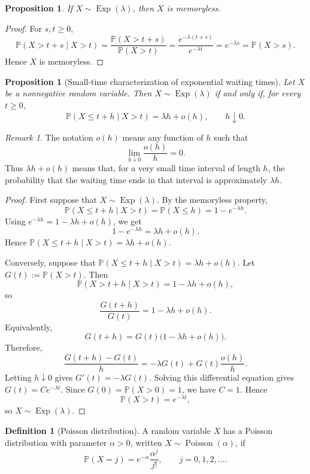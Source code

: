 \documentclass[11pt]{article}
\theoremstyle{plain}
\newtheorem{proposition}[theorem]{Proposition}
\theoremstyle{definition}
\newtheorem{definition}[theorem]{Definition}
\theoremstyle{remark}
\newtheorem{remark}[theorem]{Remark}
\begin{document}
\begin{proposition}
	If \(X\sim \operatorname{Exp}(\lambda)\), then \(X\) is memoryless.
\end{proposition}

\begin{proof}
	For \(s,t\ge 0\),
	\[
	\mathbb{P}(X>t+s\mid X>t)
	=
	\frac{\mathbb{P}(X>t+s)}{\mathbb{P}(X>t)}
	=
	\frac{e^{-\lambda(t+s)}}{e^{-\lambda t}}
	=
	e^{-\lambda s}
	=
	\mathbb{P}(X>s).
	\]
	Hence \(X\) is memoryless.
\end{proof}

\begin{proposition}[Small-time characterization of exponential waiting times]
	Let \(X\) be a nonnegative random variable. Then \(X\sim \operatorname{Exp}(\lambda)\) if and only if, for every \(t\ge 0\),
	\[
	\mathbb{P}(X\le t+h\mid X>t)=\lambda h+o(h),
	\qquad h\downarrow 0.
	\]
\end{proposition}

\begin{remark}
	The notation \(o(h)\) means any function of \(h\) such that
	\[
	\lim_{h\downarrow 0}\frac{o(h)}{h}=0.
	\]
	Thus \(\lambda h+o(h)\) means that, for a very small time interval of length \(h\), the probability that the waiting time ends in that interval is approximately \(\lambda h\).
\end{remark}

\begin{proof}
	First suppose that \(X\sim \operatorname{Exp}(\lambda)\). By the memoryless property,
	\[
	\mathbb{P}(X\le t+h\mid X>t)
	=
	\mathbb{P}(X\le h)
	=
	1-e^{-\lambda h}.
	\]
	Using \(e^{-\lambda h}=1-\lambda h+o(h)\), we get
	\[
	1-e^{-\lambda h}=\lambda h+o(h).
	\]
	Hence \(\mathbb{P}(X\le t+h\mid X>t)=\lambda h+o(h)\).
	
	Conversely, suppose that \(\mathbb{P}(X\le t+h\mid X>t)=\lambda h+o(h)\). Let \(G(t):=\mathbb{P}(X>t)\). Then
	\[
	\mathbb{P}(X>t+h\mid X>t)=1-\lambda h+o(h),
	\]
	so
	\[
	\frac{G(t+h)}{G(t)}=1-\lambda h+o(h).
	\]
	Equivalently,
	\[
	G(t+h)=G(t)\bigl(1-\lambda h+o(h)\bigr).
	\]
	Therefore,
	\[
	\frac{G(t+h)-G(t)}{h}
	=
	-\lambda G(t)+G(t)\frac{o(h)}{h}.
	\]
	Letting \(h\downarrow 0\) gives \(G'(t)=-\lambda G(t)\). Solving this differential equation gives \(G(t)=Ce^{-\lambda t}\). Since \(G(0)=\mathbb{P}(X>0)=1\), we have \(C=1\). Hence
	\[
	\mathbb{P}(X>t)=e^{-\lambda t},
	\]
	so \(X\sim \operatorname{Exp}(\lambda)\).
\end{proof}

\begin{definition}[Poisson distribution]
	A random variable \(X\) has a Poisson distribution with parameter \(\alpha>0\), written \(X\sim \operatorname{Poisson}(\alpha)\), if
	\[
	\mathbb{P}(X=j)=e^{-\alpha}\frac{\alpha^j}{j!},
	\qquad j=0,1,2,\dots.
	\]
\end{definition}
\end{document}
